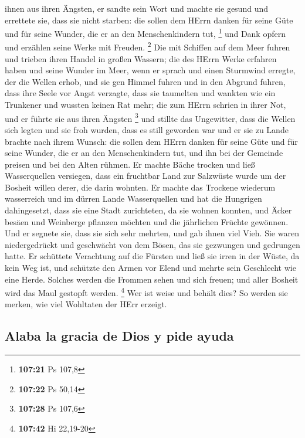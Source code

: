 ihnen aus ihren Ängsten,  er sandte sein Wort und machte
sie gesund und errettete sie, dass sie nicht starben: 
die sollen dem HErrn danken für seine Güte und für seine Wunder, die er
an den Menschenkindern tut, \footnote{\textbf{107:21} Ps 107,8}
 und Dank opfern und erzählen seine Werke mit Freuden.
\footnote{\textbf{107:22} Ps 50,14}  Die mit Schiffen auf
dem Meer fuhren und trieben ihren Handel in großen Wassern;
 die des HErrn Werke erfahren haben und seine Wunder im
Meer,  wenn er sprach und einen Sturmwind erregte, der
die Wellen erhob,  und sie gen Himmel fuhren und in den
Abgrund fuhren, dass ihre Seele vor Angst verzagte,  dass
sie taumelten und wankten wie ein Trunkener und wussten keinen Rat mehr;
 die zum HErrn schrien in ihrer Not, und er führte sie
aus ihren Ängsten \footnote{\textbf{107:28} Ps 107,6} 
und stillte das Ungewitter, dass die Wellen sich legten 
und sie froh wurden, dass es still geworden war und er sie zu Lande
brachte nach ihrem Wunsch:  die sollen dem HErrn danken
für seine Güte und für seine Wunder, die er an den Menschenkindern tut,
 und ihn bei der Gemeinde preisen und bei den Alten
rühmen.  Er machte Bäche trocken und ließ Wasserquellen
versiegen,  dass ein fruchtbar Land zur Salzwüste wurde
um der Bosheit willen derer, die darin wohnten.  Er
machte das Trockene wiederum wasserreich und im dürren Lande
Wasserquellen  und hat die Hungrigen dahingesetzt, dass
sie eine Stadt zurichteten, da sie wohnen konnten,  und
Äcker besäen und Weinberge pflanzen möchten und die jährlichen Früchte
gewönnen.  Und er segnete sie, dass sie sich sehr
mehrten, und gab ihnen viel Vieh.  Sie waren
niedergedrückt und geschwächt von dem Bösen, das sie gezwungen und
gedrungen hatte.  Er schüttete Verachtung auf die Fürsten
und ließ sie irren in der Wüste, da kein Weg ist,  und
schützte den Armen vor Elend und mehrte sein Geschlecht wie eine Herde.
 Solches werden die Frommen sehen und sich freuen; und
aller Bosheit wird das Maul gestopft werden. \footnote{\textbf{107:42}
  Hi 22,19-20}  Wer ist weise und behält dies? So werden
sie merken, wie viel Wohltaten der HErr erzeigt.

\hypertarget{alaba-la-gracia-de-dios-y-pide-ayuda}{%
\subsection{Alaba la gracia de Dios y pide
ayuda}\label{alaba-la-gracia-de-dios-y-pide-ayuda}}

